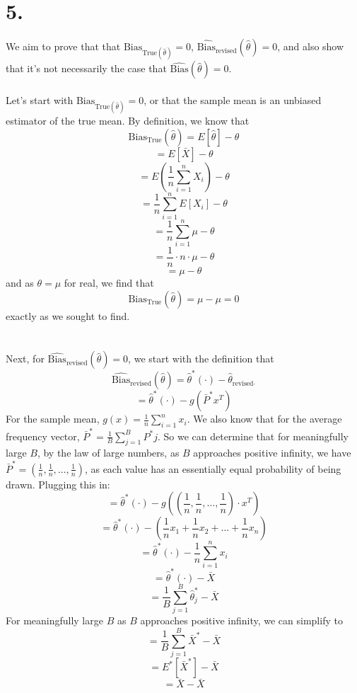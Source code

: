 \documentclass{article}
\begin{document}
{\Large 

\section*{5.}

We aim to prove that that \(\text{Bias}_{\text{True}(\hat{\theta})} = 0\), \(\hat{\text{Bias}}_{\text{revised}}(\hat{\theta}) = 0\), and also show that it's not necessarily the case that \(\hat{\text{Bias}}(\hat{\theta}) = 0\). \\ \\
Let's start with \(\text{Bias}_{\text{True}(\hat{\theta})} = 0\), or that the sample mean is an unbiased estimator of the true mean. By definition, we know that 
\[
  \text{Bias}_{\text{True}}(\hat{\theta}) = E[\hat{\theta}] - \theta
\]
\[
  = E[\bar{X}] - \theta
\]
\[
  = E(\frac{1}{n}\sum_{i=1}^n X_i) - \theta
\]
\[
  = \frac{1}{n}\sum_{i=1}^n E[X_i] - \theta
\]
\[
  = \frac{1}{n}\sum_{i=1}^n \mu - \theta
\]
\[
  = \frac{1}{n} \cdot n \cdot \mu - \theta
\]
\[
  = \mu - \theta
\]
and as \(\theta = \mu\) for real, we find that 
\[
  \text{Bias}_{\text{True}}(\hat{\theta}) = \mu - \mu = 0 
\]
exactly as we sought to find. \\ \\ \\
Next, for \(\hat{\text{Bias}}_{\text{revised}}(\hat{\theta}) = 0\), we start with the definition that 
\[
  \hat{\text{Bias}}_{\text{revised}}(\hat{\theta}) = \hat{\theta}^*(\cdot) - \hat{\theta}_{\text{revised} \cdot}
\]
\[
  = \hat{\theta}^*(\cdot) - g (\bar{P}^* x^T)
\]
For the sample mean, \(g(x) = \frac{1}{n} \sum_{i=1}^n x_i\). We also know that for the average frequency vector, \(\bar{P}^* = \frac{1}{B} \sum_{j=1}^{B} P^*j\). So we can determine that for meaningfully large \(B\), by the law of large numbers, as \(B\) approaches positive infinity, we have \(\bar{P}^* = (\frac{1}{n}, \frac{1}{n}, \dots, \frac{1}{n})\), as each value has an essentially equal probability of being drawn. Plugging this in:
\[
  = \hat{\theta}^*(\cdot) - g ((\frac{1}{n}, \frac{1}{n}, \dots, \frac{1}{n}) \cdot x^T)
\]
\[
  = \hat{\theta}^*(\cdot) - (\frac{1}{n}x_1 + \frac{1}{n}x_2 + \dots + \frac{1}{n}x_n)
\]
\[
  = \hat{\theta}^*(\cdot) - \frac{1}{n}\sum_{i=1}^{n} x_i
\]
\[
  = \hat{\theta}^*(\cdot) - \bar{X}
\]
\[
  = \frac{1}{B} \sum_{j=1}^B \hat{\theta}^*_j - \bar{X}
\]
For meaningfully large \(B\) as \(B\) approaches positive infinity, we can simplify to 
\[
  = \frac{1}{B} \sum_{j=1}^B \bar{X}^* - \bar{X}
\]
\[
  = E^*[\bar{X}^*] - \bar{X}
\]
\[
  = \bar{X} - \bar{X}
\]}
\end{document}
